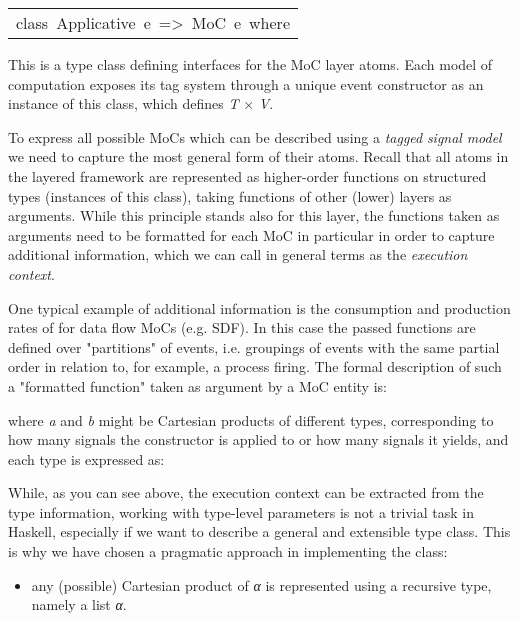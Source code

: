 \begin{haddockdesc}
\item[\begin{tabular}{@{}l}
class\ Applicative\ e\ =>\ MoC\ e\ where
\end{tabular}]\haddockbegindoc
This is a type class defining interfaces for the MoC layer
 atoms. Each model of computation exposes its tag system through a
 unique event constructor as an instance of this class, which
 defines \emph{T} × \emph{V}.\par
 To express all possible MoCs which can be described using
 a \emph{tagged} \emph{signal} \emph{model} we need to capture the most general
 form of their atoms. Recall that all atoms in the layered framework
 are represented as higher-order functions on structured types
 (instances of this class), taking functions of other (lower) layers
 as arguments. While this principle stands also for this layer, the
 functions taken as arguments need to be formatted for each MoC in
 particular in order to capture additional information, which we can
 call in general terms as the \emph{execution context}.\par
One typical example of additional information is the consumption
 and production rates of for data flow MoCs (e.g. SDF). In this case
 the passed functions are defined over "partitions" of events,
 i.e. groupings of events with the same partial order in relation
 to, for example, a process firing. The formal description of such a
 "formatted function" taken as argument by a MoC entity is:\par
{}\par
where \emph{a} and \emph{b} might be Cartesian products of different types,
 corresponding to how many signals the constructor is applied to or
 how many signals it yields, and each type is expressed as:\par
{}\par
While, as you can see above, the execution context can be extracted
 from the type information, working with type-level parameters is
 not a trivial task in Haskell, especially if we want to describe a
 general and extensible type class. This is why we have chosen a
 pragmatic approach in implementing the  class:\par
\begin{itemize}
\item
any (possible) Cartesian product of \emph{α} is represented using
 a recursive type, namely a list {}\emph{α}{}.\par


\end{itemize}
\end{haddockdesc}
